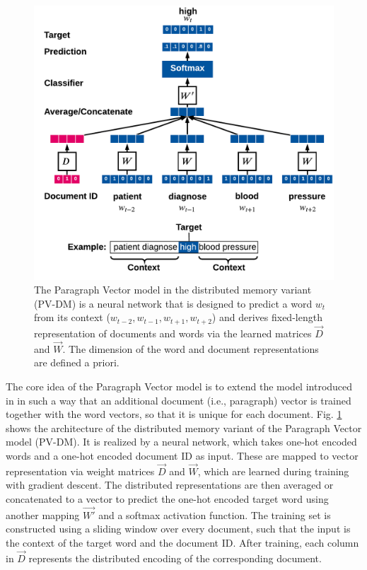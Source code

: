 \begin{figure}[!htbp]
	\centering
	\includegraphics[width=\textwidth]{figures/paragraph-vector}
	\caption[Paragraph Vector model]{The Paragraph Vector model in the distributed memory variant (PV-DM) is a neural network that is designed to predict a word $w_t$ from its context ($w_{t-2}, w_{t-1}, w_{t+1}, w_{t+2}$) and derives fixed-length representation of documents and words via the learned matrices $\vec{D}$ and $\vec{W}$. The dimension of the word and document representations are defined a priori.}
	\label{fig:paragraph-vector}
\end{figure}

The core idea of the Paragraph Vector model is to extend the model introduced in \cite{DBLP:journals/jmlr/BengioDVJ03} in such a way that an additional document (i.e., paragraph) vector is trained together with the word vectors, so that it is unique for each document.
Fig. \ref{fig:paragraph-vector} shows the architecture of the distributed memory variant of the Paragraph Vector model (PV-DM).
It is realized by a neural network, which takes one-hot encoded words and a one-hot encoded document ID as input.
These are mapped to vector representation via weight matrices $\vec{D}$ and $\vec{W}$, which are learned during training with gradient descent.
The distributed representations are then averaged or concatenated to a vector to predict the one-hot encoded target word using another mapping $\vec{W'}$ and a softmax activation function.
The training set is constructed using a sliding window over every document, such that the input is the context of the target word and the document ID.
After training, each column in $\vec{D}$ represents the distributed encoding of the corresponding document.

